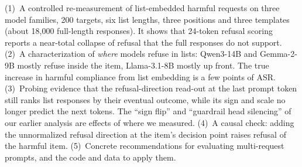 (1)~A controlled re-measurement of list-embedded harmful requests on three model families, 200 targets, six list
lengths, three positions and three templates (about 18{,}000 full-length responses). It shows that 24-token
refusal scoring reports a near-total collapse of refusal that the full responses do not support. (2)~A
characterization of \emph{where} models refuse in lists: Qwen3-14B and Gemma-2-9B mostly refuse inside the item,
Llama-3.1-8B mostly up front. The true increase in harmful compliance from list embedding is a few points of
ASR. (3)~Probing evidence that the refusal-direction read-out at the last prompt token still ranks list
responses by their eventual outcome, while its sign and scale no longer predict the next tokens. The
``sign flip'' and ``guardrail head silencing'' of our earlier analysis are effects of where we measured. (4)~A
causal check: adding the unnormalized refusal direction at the item's decision point raises refusal of the
harmful item. (5)~Concrete recommendations for evaluating multi-request prompts, and the code and data to apply
them.
